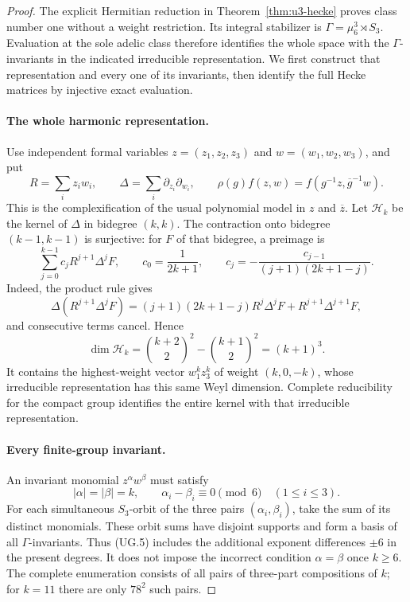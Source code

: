 \begin{proof}
The explicit Hermitian reduction in Theorem~\ref{thm:u3-hecke} proves
class number one without a weight restriction. Its integral stabilizer
is $\Gamma=\mu_6^3\rtimes S_3$. Evaluation at the sole adelic class
therefore identifies the whole space with the $\Gamma$-invariants in
the indicated irreducible representation. We first construct that
representation and every one of its invariants, then identify the full
Hecke matrices by injective exact evaluation.

\paragraph{The whole harmonic representation.}
Use independent formal variables $z=(z_1,z_2,z_3)$ and
$w=(w_1,w_2,w_3)$, and put
\[
 R=\sum_i z_iw_i,\qquad
 \Delta=\sum_i\partial_{z_i}\partial_{w_i},\qquad
 \rho(g)f(z,w)=f(g^{-1}z,\overline g^{-1}w).
 \tag{UG.3}
\]
This is the complexification of the usual polynomial model in $z$ and
$\overline z$. Let $\mathcal H_k$ be the kernel of $\Delta$ in
bidegree $(k,k)$. The contraction onto bidegree $(k-1,k-1)$ is
surjective: for $F$ of that bidegree, a preimage is
\[
 \sum_{j=0}^{k-1}c_jR^{j+1}\Delta^jF,\qquad
 c_0=\frac1{2k+1},\qquad
 c_j=-\frac{c_{j-1}}{(j+1)(2k+1-j)}.
 \tag{UG.4}
\]
Indeed, the product rule gives
\[
 \Delta(R^{j+1}\Delta^jF)
 =(j+1)(2k+1-j)R^j\Delta^jF+R^{j+1}\Delta^{j+1}F,
\]
and consecutive terms cancel. Hence
\[
 \dim\mathcal H_k
 =\binom{k+2}{2}^{\!2}-\binom{k+1}{2}^{\!2}=(k+1)^3.
\]
It contains the highest-weight vector $w_1^kz_3^k$ of weight
$(k,0,-k)$, whose irreducible representation has this same Weyl
dimension. Complete reducibility for the compact group identifies
the entire kernel with that irreducible representation.

\paragraph{Every finite-group invariant.}
An invariant monomial $z^\alpha w^\beta$ must satisfy
\[
 |\alpha|=|\beta|=k,\qquad
 \alpha_i-\beta_i\equiv0\pmod6\quad(1\le i\le3).
 \tag{UG.5}
\]
For each simultaneous $S_3$-orbit of the three pairs
$(\alpha_i,\beta_i)$, take the sum of its distinct monomials.
These orbit sums have disjoint supports and form a basis of all
$\Gamma$-invariants. Thus (UG.5) includes the additional exponent
differences $\pm6$ in the present degrees. It does not impose the
incorrect condition $\alpha=\beta$ once $k\ge6$.
The complete enumeration consists of all pairs of three-part
compositions of $k$; for $k=11$ there are only $78^2$ such pairs.


\end{proof}
